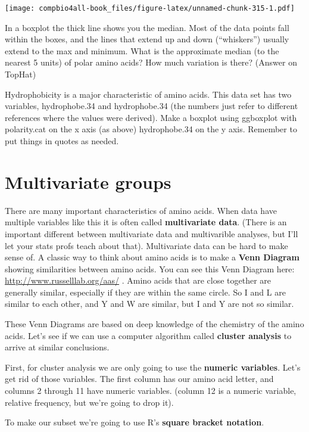 \documentclass[
]{book}
\begin{document}
\texttt{[image: compbio4all-book\_files/figure-latex/unnamed-chunk-315-1.pdf]}

In a boxplot the thick line shows you the median. Most of the data points fall within the boxes, and the lines that extend up and down (``whiskers'') usually extend to the max and minimum. What is the approximate median (to the nearest 5 units) of polar amino acids? How much variation is there? (Answer on TopHat)

Hydrophobicity is a major characteristic of amino acids. This data set has two variables, hydrophobe.34 and hydrophobe.34 (the numbers just refer to different references where the values were derived). Make a boxplot using ggboxplot with polarity.cat on the x axis (as above) hydrophobe.34 on the y axis. Remember to put things in quotes as needed.

\hypertarget{multivariate-groups}{%
\section{Multivariate groups}\label{multivariate-groups}}

There are many important characteristics of amino acids. When data have multiple variables like this it is often called \textbf{multivariate data}. (There is an important different between multivariate data and multivarible analyses, but I'll let your stats profs teach about that). Multivariate data can be hard to make sense of. A classic way to think about amino acids is to make a \textbf{Venn Diagram} showing similarities between amino acids. You can see this Venn Diagram here: \url{http://www.russelllab.org/aas/} . Amino acids that are close together are generally similar, especially if they are within the same circle. So I and L are similar to each other, and Y and W are similar, but I and Y are not so similar.

These Venn Diagrams are based on deep knowledge of the chemistry of the amino acids. Let's see if we can use a computer algorithm called \textbf{cluster analysis} to arrive at similar conclusions.

First, for cluster analysis we are only going to use the \textbf{numeric variables}. Let's get rid of those variables. The first column has our amino acid letter, and columns 2 through 11 have numeric variables. (column 12 is a numeric variable, relative frequency, but we're going to drop it).

To make our subset we're going to use R's \textbf{square bracket notation}.
\end{document}
